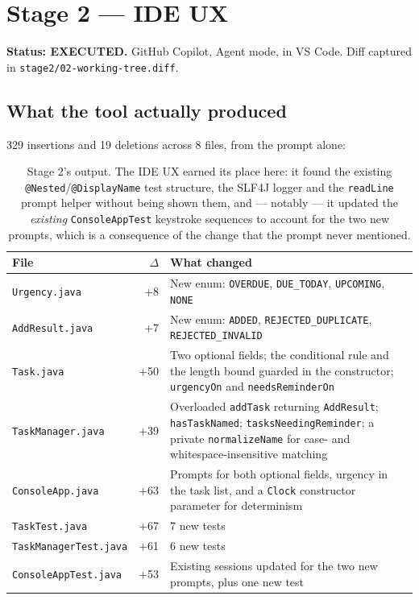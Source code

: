 \documentclass[11pt,a4paper]{article}
\newcommand{\code}[1]{\texttt{\small #1}}
\newcommand{\ran}{\textcolor{good}{\textbf{EXECUTED}}}
\begin{document}
\section{Stage 2 --- IDE UX}

\textbf{Status: \ran.} GitHub Copilot, Agent mode, in VS Code. Diff captured in
\code{stage2/02-working-tree.diff}.

\subsection{What the tool actually produced}

329 insertions and 19 deletions across 8 files, from the prompt alone:

\begin{table}[h]
\centering
\small
\begin{tabularx}{\textwidth}{@{}l r X@{}}
\toprule
\textbf{File} & \textbf{$\Delta$} & \textbf{What changed} \\
\midrule
\code{Urgency.java} & +8 & New enum: \code{OVERDUE}, \code{DUE\_TODAY}, \code{UPCOMING}, \code{NONE} \\
\code{AddResult.java} & +7 & New enum: \code{ADDED}, \code{REJECTED\_DUPLICATE}, \code{REJECTED\_INVALID} \\
\code{Task.java} & +50 & Two optional fields; the conditional rule and the length bound guarded in the constructor; \code{urgencyOn} and \code{needsReminderOn} \\
\code{TaskManager.java} & +39 & Overloaded \code{addTask} returning \code{AddResult}; \code{hasTaskNamed}; \code{tasksNeedingReminder}; a private \code{normalizeName} for case- and whitespace-insensitive matching \\
\code{ConsoleApp.java} & +63 & Prompts for both optional fields, urgency in the task list, and a \code{Clock} constructor parameter for determinism \\
\code{TaskTest.java} & +67 & 7 new tests \\
\code{TaskManagerTest.java} & +61 & 6 new tests \\
\code{ConsoleAppTest.java} & +53 & Existing sessions updated for the two new prompts, plus one new test \\
\bottomrule
\end{tabularx}
\caption{Stage 2's output. The IDE UX earned its place here: it found the
existing \code{@Nested}/\code{@DisplayName} test structure, the SLF4J logger and
the \code{readLine} prompt helper without being shown them, and --- notably ---
it updated the \emph{existing} \code{ConsoleAppTest} keystroke sequences to
account for the two new prompts, which is a consequence of the change that the
prompt never mentioned.}
\end{table}
\end{document}
